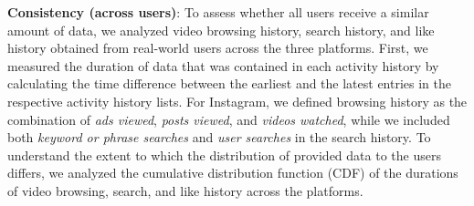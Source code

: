 \noindent
\textbf{Consistency (across users)}:
To assess whether all users receive a similar amount of data, we analyzed video browsing history, search history, and like history obtained from real-world users across the three platforms.
First, we measured the duration of data that was contained in each activity history by calculating the time difference between the earliest and the latest entries in the respective activity history lists.
For Instagram, we defined browsing history as the combination of \textit{ads viewed}, \textit{posts viewed}, and \textit{videos watched}, while we included both \textit{keyword or phrase searches} and \textit{user searches} in the search history.
To understand the extent to which the distribution of provided data to the users differs, we analyzed the cumulative distribution function (CDF) of the durations of video browsing, search, and like history across the platforms.

